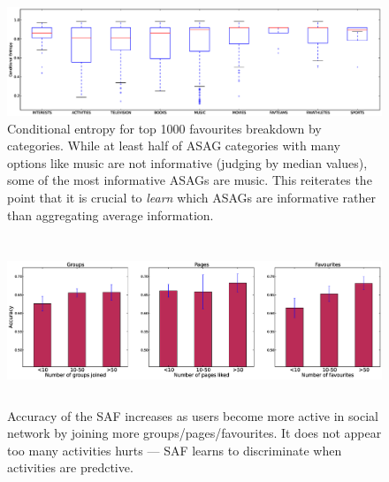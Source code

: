 
\begin{figure}[tbph!]
\hspace{-12mm}\includegraphics[width=200mm]{data/plots/boxPlots/CEvsFavTypes.eps}
\vspace{-7mm}
\caption{Conditional entropy for top 1000 favourites breakdown by categories.  While
at least half of ASAG categories
with many options like music are not informative (judging by median values), 
some of the most informative ASAGs are music.  This reiterates
the point that it is crucial to \emph{learn} which ASAGs 
are informative rather than aggregating average information.}
\label{Fig5}
\end{figure}


\begin{figure}[tbh!]
\centering
\includegraphics[width=180mm, height=50mm]{data/plots/new/accuracyVsmembership.eps}
\vspace{-6mm}
\caption{Accuracy of the SAF increases as users become more active in social network by joining more groups/pages/favourites.  It does not appear too many activities hurts --- SAF learns to discriminate when activities are predctive.}
\label{AccuracyVsmembership}
\end{figure}

